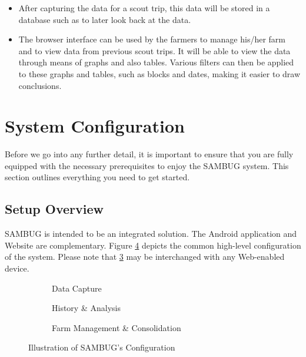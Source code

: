 \documentclass[11pt,a4paper,titlepage]{article}
\begin{document}
\begin{itemize}
		\item After capturing the data for a scout trip, this data will 			be stored in a database such as to later look back at the data.
		\item The browser interface can be used by the farmers to manage 			his/her farm and to view data from previous scout trips. It will 			be able to view the data through means of graphs and also tables. 		Various filters can then be applied to these graphs and tables, 			such as blocks and dates, making it easier to draw conclusions.
	\end{itemize}
\section{System Configuration}
Before we go into any further detail, it is important to ensure that you are fully equipped with the necessary prerequisites to enjoy the SAMBUG system. This section outlines everything you need to get started.
\subsection{Setup Overview}
SAMBUG is intended to be an integrated solution. The Android application and Website are complementary. Figure \ref{fig:layout} depicts the common high-level configuration of the system. Please note that \ref{fig:Web} may be interchanged with any Web-enabled device.
	\begin{figure}[h]
		\begin{subfigure}{0.3\textwidth}
		\caption{Data Capture}		
		\label{fig:dataCapt}	
		\end{subfigure}
		\begin{subfigure}{0.3\textwidth}
		\caption{History \& Analysis}		
		\label{fig:Engine}	
		\end{subfigure}
		\begin{subfigure}{0.3\textwidth}
		\caption{Farm Management \& Consolidation}	
		\label{fig:Web}		
		\end{subfigure}
	\caption{Illustration of SAMBUG's Configuration}
	\label{fig:layout}
	\end{figure}
\end{document}
